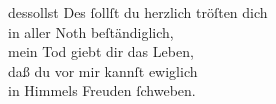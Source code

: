 \documentclass[tocstyle=ref-genre]{ees}
\begin{document}
{  \begin{movement}{dessollst}
    \voice[Coro]
    Des ſollſt du herzlich tröſten dich\\
    in aller Noth beſtändiglich,\\
    mein Tod giebt dir das Leben,\\
    daß du vor mir kannſt ewiglich\\
    in Himmels Freuden ſchweben.
  \end{movement}

  \begin{movement}{}
    \voice[]
  \end{movement}

  \begin{movement}{}
    \voice[]
  \end{movement}

  \begin{movement}{}
    \voice[]
  \end{movement}

  \begin{movement}{}
    \voice[]
  \end{movement}

  \begin{movement}{}
    \voice[]
  \end{movement}

  \begin{movement}{}
    \voice[]
  \end{movement}

  \begin{movement}{}
    \voice[]
  \end{movement}

  \begin{movement}{}
    \voice[]
  \end{movement}

  \begin{movement}{}
    \voice[]
  \end{movement}

  \begin{movement}{}
    \voice[]
  \end{movement}
}

\eesScore
\end{document}
